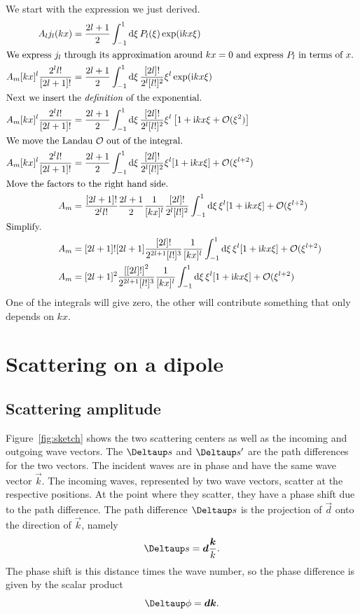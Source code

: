 \documentclass[11pt, english, fleqn, DIV=15, headinclude, BCOR=1.5cm]{scrartcl}
\begin{document}
We start with the expression we just derived.
\begin{align*}
    A_l j_l(kx)
    &= \frac{2l+1}{2} \int_{-1}^1 \dif \xi \, P_l(\xi) \exp(\iup k x \xi) \\
    \intertext{%
        We express $j_l$ through its approximation around $kx = 0$ and express
        $P_l$ in terms of $x$.
    }
    A_m [kx]^l \frac{2^l l!}{[2l+1]!}
    &= \frac{2l+1}{2} \int_{-1}^1 \dif \xi \, \frac{[2l]!}{2^l[l!]^2} \xi^l \exp(\iup k x \xi) \\
    \intertext{%
        Next we insert the \emph{definition} of the exponential.
    }
    A_m [kx]^l \frac{2^l l!}{[2l+1]!}
    &= \frac{2l+1}{2} \int_{-1}^1 \dif \xi \, \frac{[2l]!}{2^l[l!]^2} \xi^l
    \sbr{1 + \iup k x \xi + \mathcal O(\xi^2)} \\
    \intertext{%
        We move the Landau $\mathcal O$ out of the integral.
    }
    A_m [kx]^l \frac{2^l l!}{[2l+1]!}
    &= \frac{2l+1}{2} \int_{-1}^1 \dif \xi \, \frac{[2l]!}{2^l[l!]^2} \xi^l
    [1 + \iup k x \xi] + \mathcal O(\xi^{l+2}) \\
    \intertext{%
        Move the factors to the right hand side.
    }
    A_m &= \frac{[2l+1]!}{2^l l!} \frac{2l+1}{2} \frac{1}{[kx]^l}
    \frac{[2l]!}{2^l[l!]^2} \int_{-1}^1 \dif \xi \, \xi^l [1 + \iup k x \xi] +
    \mathcal O(\xi^{l+2}) \\
    \intertext{%
        Simplify.
    }
    A_m &= [2l+1]! [2l+1] \frac{[2l]!}{2^{2l+1} [l!]^3} \frac{1}{[kx]^l}
    \int_{-1}^1 \dif \xi \, \xi^l [1 + \iup k x \xi] + \mathcal O(\xi^{l+2}) \\
    A_m &= [2l+1]^2 \frac{\sbr{[2l]!}^2}{2^{2l+1} [l!]^3} \frac{1}{[kx]^l}
    \int_{-1}^1 \dif \xi \, \xi^l [1 + \iup k x \xi] + \mathcal O(\xi^{l+2})
\end{align*}
One of the integrals will give zero, the other will contribute something that
only depends on $kx$.

\section{Scattering on a dipole}

\subsection{Scattering amplitude}

Figure~\ref{fig:sketch} shows the two scattering centers as well as the
incoming and outgoing wave vectors. The $\Deltaup s$ and $\Deltaup s'$ are the
path differences for the two vectors. The incident waves are in phase and have
the same wave vector $\vec k$. The incoming waves, represented by two wave
vectors, scatter at the respective positions. At the point where they scatter,
they have a phase shift due to the path difference. The path difference
$\Deltaup s$ is the projection of $\vec d$ onto the direction of $\vec k$,
namely
\[
    \Deltaup s = \vec d \frac{\vec k}{k}.
\]
The phase shift is this distance times the wave number, so the phase difference
is given by the scalar product
\[
    \Deltaup \phi = \vec d \vec k.
\]
\end{document}
